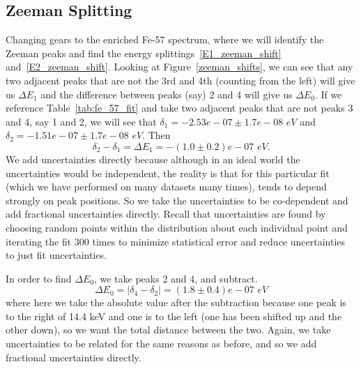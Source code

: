 \documentclass[reprint, nobibnotes, amssymb, amsmath, amsfonts, mathtools, mathrsfs, floatfix]{revtex4-1}
\begin{document}
    \subsection{Zeeman Splitting}
      Changing gears to the enriched Fe-57 spectrum, where we will identify the Zeeman peaks and find the energy splittings~\ref{E1_zeeman_shift} and~\ref{E2_zeeman_shift}.  Looking at Figure~\ref{zeeman_shifts}, we can see that any two adjacent peaks that are not the 3rd and 4th (counting from the left) will give us $\Delta E_1$ and the difference between peaks (say) 2 and 4 will give us $\Delta E_0$.  If we reference Table~\ref{tab:fe_57_fit} and take two adjacent peaks that are not peaks 3 and 4, say 1 and 2, we will see that $\delta_1 = -2.53e-07 \pm 1.7e-08 \,\, eV$ and $\delta_2 = -1.51e-07 \pm 1.7e-08 \,\, eV$.  Then
      \begin{equation}
        \delta_2 - \delta_1 = \Delta E_1 = -(1.0\pm0.2)e-07 \,\, eV.
      \end{equation}
      We add uncertainties directly because although in an ideal world the uncertainties would be independent, the reality is that for this particular fit (which we have performed on many datasets many times), tends to depend strongly on peak positions.  So we take the uncertainties to be co-dependent and add fractional uncertainties directly.  Recall that uncertainties are found by choosing random points within the distribution about each individual point and iterating the fit 300 times to minimize statistical error and reduce uncertainties to just fit uncertainties.

      In order to find $\Delta E_0$, we take peaks 2 and 4, and subtract.
      \begin{equation}
        \Delta E_0 = |\delta_4 - \delta_2| = (1.8\pm0.4)e-07 \,\, eV
      \end{equation}
      where here we take the absolute value after the subtraction because one peak is to the right of 14.4 keV and one is to the left (one has been shifted up and the other down), so we want the total distance between the two.  Again, we take uncertainties to be related for the same reasons as before, and so we add fractional uncertainties directly.
\end{document}
